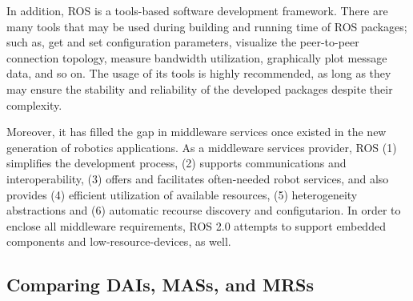 In addition, ROS is a tools-based software development framework. There are many tools that may be used during building and running time of ROS packages; such as, get and set configuration parameters, visualize the peer-to-peer connection topology, measure bandwidth utilization, graphically plot message data, and so on. The usage of its tools is highly recommended, as long as they may ensure the stability and reliability of the developed packages despite their complexity. 

Moreover, it has filled the gap in middleware services once existed in the new generation of robotics applications. As a middleware services provider, ROS (1) simplifies the development process, (2) supports communications and interoperability, (3) offers and facilitates often-needed robot services, and also provides (4) efficient utilization of available resources, (5) heterogeneity abstractions and (6) automatic recourse discovery and configutarion. In order to enclose all middleware requirements, ROS 2.0 attempts to support embedded components and low-resource-devices, as well.





\subsection{Comparing DAIs, MASs, and MRSs}

